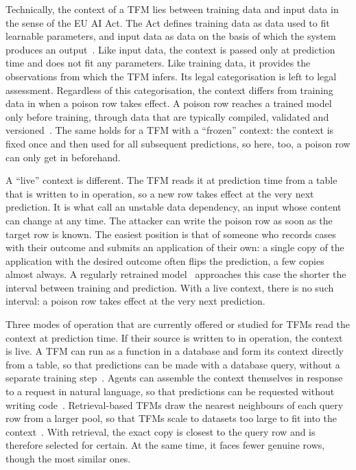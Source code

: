 \documentclass[pdflatex,sn-mathphys-num]{sn-jnl}
\begin{document}
Technically, the context of a TFM lies between training data and input
data in the sense of the EU AI Act. The Act defines training data as data
used to fit learnable parameters, and input data as data on the basis of
which the system produces an output~\citep[Art.~3(29) and~(33)]{euaiact2024}.
Like input data, the context is passed only at prediction time and does
not fit any parameters. Like training data, it provides the observations
from which the TFM infers. Its legal categorisation is left to legal assessment. Regardless of this categorisation, the context differs from training
data in when a poison row takes effect. A poison row reaches a trained
model only before training, through data that are typically compiled,
validated and versioned~\citep{baylor2017, breck2019, kreuzberger2023}.
The same holds for a TFM with a \enquote{frozen} context: the context is fixed once
and then used for all subsequent predictions, so here, too, a poison row
can only get in beforehand.

A \enquote{live} context is different. The TFM reads it at prediction time from a
table that is written to in operation, so a new row takes effect at the
very next prediction. It is what \citet{sculley2015} call an unstable
data dependency, an input whose content can change at any time. The
attacker can write the poison row as soon as the target row is known.
The easiest position is that of someone who records cases with their
outcome and submits an application of their own: a single copy of the
application with the desired outcome often flips the prediction, a few
copies almost always. A regularly retrained model~\citep{kreuzberger2023}
approaches this case the shorter the interval between training and
prediction. With a live context, there is no such interval: a
poison row takes effect at the very next prediction.

Three modes of operation that are currently offered or studied for TFMs
read the context at prediction time. If their source is written to in
operation, the context is live. A TFM can run as a function in a
database and form its context directly from a table, so that predictions
can be made with a database query, without a separate training
step~\citep{kongdas2026, googlecloud2026}. Agents can assemble the
context themselves in response to a request in natural language, so that
predictions can be requested without writing
code~\citep{priorlabsmcp2026}. Retrieval-based TFMs draw the nearest
neighbours of each query row from a larger pool, so that TFMs scale to
datasets too large to fit into the context~\citep{ma2025, thomas2024}. With retrieval, the exact copy is closest to the query
row and is therefore selected for certain. At the same time, it faces
fewer genuine rows, though the most similar ones.
\end{document}
